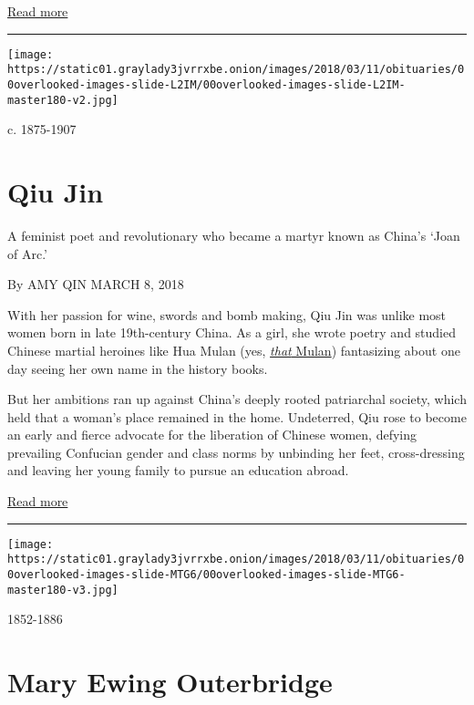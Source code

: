 \href{https://www.nytimes3xbfgragh.onion/interactive/2018/obituaries/overlooked.html}{Read
more}

\begin{center}\rule{0.5\linewidth}{\linethickness}\end{center}

\texttt{[image: https://static01.graylady3jvrrxbe.onion/images/2018/03/11/obituaries/00overlooked-images-slide-L2IM/00overlooked-images-slide-L2IM-master180-v2.jpg]}

c. 1875-1907

\hypertarget{qiu-jin}{%
\section{Qiu Jin}\label{qiu-jin}}

A feminist poet and revolutionary who became a martyr known as China's
`Joan of Arc.'

By AMY QIN MARCH 8, 2018

With her passion for wine, swords and bomb making, Qiu Jin was unlike
most women born in late 19th-century China. As a girl, she wrote poetry
and studied Chinese martial heroines like Hua Mulan (yes,
\href{https://www.imdb.com/title/tt0120762/}{\emph{that} Mulan})
fantasizing about one day seeing her own name in the history books.

But her ambitions ran up against China's deeply rooted patriarchal
society, which held that a woman's place remained in the home.
Undeterred, Qiu rose to become an early and fierce advocate for the
liberation of Chinese women, defying prevailing Confucian gender and
class norms by unbinding her feet, cross-dressing and leaving her young
family to pursue an education abroad.

\href{https://www.nytimes3xbfgragh.onion/interactive/2018/obituaries/overlooked-qiu-jin.html}{Read
more}

\begin{center}\rule{0.5\linewidth}{\linethickness}\end{center}

\texttt{[image: https://static01.graylady3jvrrxbe.onion/images/2018/03/11/obituaries/00overlooked-images-slide-MTG6/00overlooked-images-slide-MTG6-master180-v3.jpg]}

1852-1886

\hypertarget{mary-ewing-outerbridge}{%
\section{Mary Ewing Outerbridge}\label{mary-ewing-outerbridge}}

